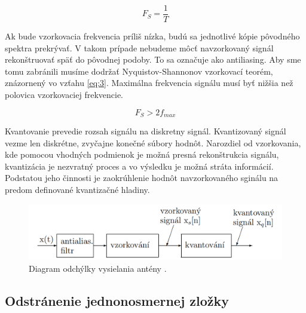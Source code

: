    \begin{equation} \label{eq:2}
      F_{S} = \frac{1}{T}
    \end{equation}

    Ak bude vzorkovacia frekvencia príliš nízka, budú sa jednotlivé kópie pôvodného spektra prekrývať. V takom prípade nebudeme môcť navzorkovaný signál rekonštruovať späť do pôvodnej podoby. To sa označuje ako antiliasing. Aby sme tomu zabránili musíme dodržať Nyquistov-Shannonov vzorkovací teorém, znázornený vo vzťahu \ref{eq:3}. Maximálna frekvencia signálu musí byť nižšia než polovica vzorkovaciej frekvencie.

    \begin{equation} \label{eq:3}
      F_{S} > 2 f_{max}
    \end{equation}

    Kvantovanie prevedie rozsah signálu na diskretny signál. Kvantizovaný signál vezme len diskrétne, zvyčajne konečné súbory hodnôt. Narozdiel od vzorkovania, kde pomocou vhodných podmienok je možná presná rekonštrukcia signálu, kvantizácia je nezvratný proces a vo výsledku je možná stráta informácií. Podstatou jeho činnosti je zaokrúhlenie hodnôt navzorkovaného sginálu na predom definované kvantizačné hladiny.\cite{issslajdy}\newline 

    \begin{figure}[h]
        \centering
        \includegraphics[width=.9\textwidth]{obrazky-figures/adprevod.png}
        \caption{Diagram odchýlky vysielania antény \cite{zreopora}.}
        \label{fig:adprevod}
    \end{figure}

  \subsection{Odstránenie jednonosmernej zložky}

